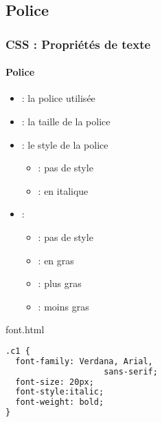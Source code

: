 \documentclass[xcolor=table]{beamer}
\begin{document}
\subsection{Police}

\begin{frame}[fragile]
\frametitle{CSS : Propriétés de texte}
\framesubtitle{Police}

\begin{minipage}{0.50\textwidth}
	\begin{itemize}
		\item {} : la police utilisée
		\item {} : la taille de la police
		\item {} : le style de la police
		\begin{itemize}
			\item {} : pas de style
			\item {} : en italique
		\end{itemize}
		\item {} : 
		\begin{itemize}
			\item {} : pas de style
			\item {} : en gras
			\item {} : plus gras
			\item {} : moins gras
		\end{itemize}
	\end{itemize}
\end{minipage}
%
\begin{minipage}{0.49\textwidth}
	\begin{exampleblock}{font.html}
		\lstset{escapeinside=**}
		\scriptsize\bfseries
\begin{lstlisting}[language={html}]
.c1 {
  font-family: Verdana, Arial, 
                    sans-serif;
  font-size: 20px;
  font-style:italic;
  font-weight: bold;
}
\end{lstlisting}
	\end{exampleblock}
\end{minipage}
\end{frame}
\end{document}
